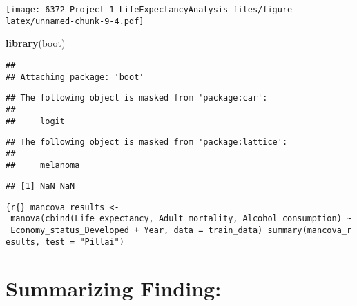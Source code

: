 \documentclass[
]{article}
\newenvironment{Shaded}{\begin{snugshade}}{\end{snugshade}}
\newcommand{\AttributeTok}[1]{\textcolor[rgb]{0.13,0.29,0.53}{#1}}
\newcommand{\CommentTok}[1]{\textcolor[rgb]{0.56,0.35,0.01}{\textit{#1}}}
\newcommand{\DecValTok}[1]{\textcolor[rgb]{0.00,0.00,0.81}{#1}}
\newcommand{\FunctionTok}[1]{\textcolor[rgb]{0.13,0.29,0.53}{\textbf{#1}}}
\newcommand{\NormalTok}[1]{#1}
\newcommand{\OtherTok}[1]{\textcolor[rgb]{0.56,0.35,0.01}{#1}}
\newcommand{\SpecialCharTok}[1]{\textcolor[rgb]{0.81,0.36,0.00}{\textbf{#1}}}
\begin{document}
\texttt{[image: 6372\_Project\_1\_LifeExpectancyAnalysis\_files/figure-latex/unnamed-chunk-9-4.pdf]}

\begin{Shaded}
\begin{Highlighting}[]
\FunctionTok{library}\NormalTok{(boot)}
\end{Highlighting}
\end{Shaded}

\begin{verbatim}
## 
## Attaching package: 'boot'
\end{verbatim}

\begin{verbatim}
## The following object is masked from 'package:car':
## 
##     logit
\end{verbatim}

\begin{verbatim}
## The following object is masked from 'package:lattice':
## 
##     melanoma
\end{verbatim}

\begin{Shaded}
\end{Shaded}

\begin{verbatim}
## [1] NaN NaN
\end{verbatim}

\texttt{\{r\{\}\ mancova\_results\ \textless{}-\ manova(cbind(Life\_expectancy,\ Adult\_mortality,\ Alcohol\_consumption)\ \textasciitilde{}\ Economy\_status\_Developed\ +\ Year,\ data\ =\ train\_data)\ summary(mancova\_results,\ test\ =\ "Pillai")}

\hypertarget{summarizing-finding}{%
\section{Summarizing Finding:}\label{summarizing-finding}}
\end{document}
